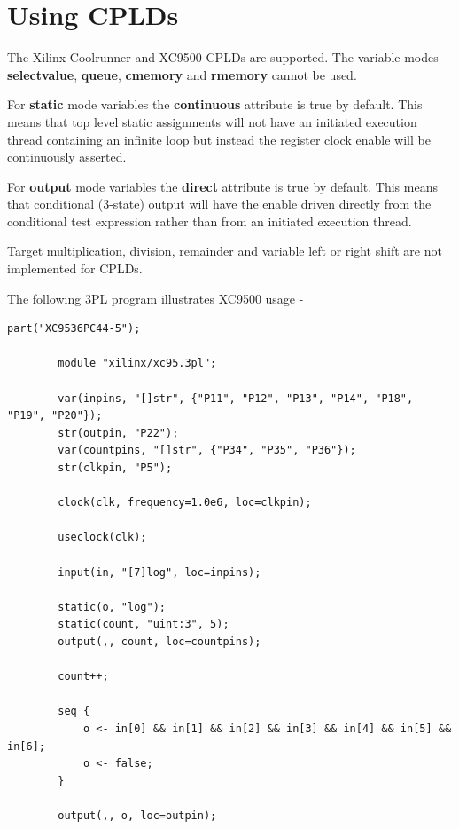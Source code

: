 \pagebreak

\chapter{Using CPLDs}

    The Xilinx Coolrunner and XC9500 CPLDs are supported. The variable modes {\bf
    selectvalue}, {\bf queue}, {\bf cmemory} and {\bf rmemory} cannot be used.
    
    For {\bf static} mode variables the {\bf continuous} attribute is true by
    default. This means that top level static assignments will not have an
    initiated execution thread containing an infinite loop but instead the register
    clock enable will be continuously asserted.

    For {\bf output} mode variables the {\bf direct} attribute is true by default.
    This means that conditional (3-state) output will have the enable
    driven directly from the conditional test expression rather than from
    an initiated execution thread.
    
    Target multiplication, division, remainder and variable left or right shift
    are not implemented for CPLDs.
    
    The following 3PL program illustrates XC9500 usage -
    \begin{lstlisting}[gobble=4, language=threepl]
        part("XC9536PC44-5");

        module "xilinx/xc95.3pl";

        var(inpins, "[]str", {"P11", "P12", "P13", "P14", "P18", "P19", "P20"});
        str(outpin, "P22");
        var(countpins, "[]str", {"P34", "P35", "P36"});
        str(clkpin, "P5");

        clock(clk, frequency=1.0e6, loc=clkpin);

        useclock(clk);

        input(in, "[7]log", loc=inpins);

        static(o, "log");
        static(count, "uint:3", 5);
        output(,, count, loc=countpins);

        count++;

        seq {
            o <- in[0] && in[1] && in[2] && in[3] && in[4] && in[5] && in[6];
            o <- false;
        }

        output(,, o, loc=outpin);
    \end{lstlisting}
    
\pagebreak

